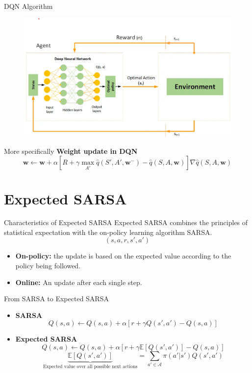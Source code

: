 \documentclass[serif]{beamer}  %
\begin{document}
\begin{frame}{DQN Algorithm}
    \begin{figure}
        \centering
        \includegraphics[width=\linewidth]{images/DQN_diagram.png}
    \end{figure}
\end{frame}

\begin{frame}{More specifically}
    \textbf{Weight update in DQN}
    $$
    \mathbf{w} \leftarrow \mathbf{w} + \alpha \left[ R + \gamma \max_{A'} \hat{q}(S', A', \mathbf{w}^{-}) - \hat{q}(S, A, \mathbf{w}) \right] \nabla \hat{q}(S, A, \mathbf{w})
    $$
\end{frame}

\section{Expected SARSA}

\begin{frame}{Characteristics of Expected SARSA}
    Expected SARSA combines the principles of statistical expectation with the on-policy learning algorithm SARSA.
    $$(s, a, r, s', a')$$
    \begin{itemize}
        \item \textbf{On-policy:} the update is based on the expected value according to the policy being followed.
        \vspace{0.5cm}
        \item \textbf{Online:} An update after each single step.
    \end{itemize}
\end{frame}

\begin{frame}{From SARSA to Expected SARSA}
    \begin{itemize}
        \item \textbf{SARSA}
        $$Q(s, a) \leftarrow Q(s, a) + \alpha \left[ r + \gamma Q(s', a') - Q(s, a) \right]$$
        \item \textbf{Expected SARSA}
        $$Q(s, a) \leftarrow Q(s, a) + \alpha \left[ r + \gamma \mathbb{E}[Q(s', a')] - Q(s, a) \right]$$
        $$\underbrace{\mathbb{E}[Q(s', a')]}_{\text{Expected value over all possible next actions}} = \sum_{a' \in \mathcal{A}} \pi(a'|s') Q(s', a')$$
    \end{itemize}
\end{frame}
\end{document}
